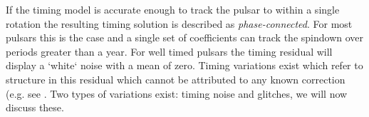If the timing model is accurate enough to track the pulsar to within a single
rotation the resulting timing solution is described as \emph{phase-connected}.
For most pulsars this is the case and a single set of coefficients can track
the spindown over periods greater than a year. For well timed pulsars the 
timing residual will display a `white` noise with a mean of zero. Timing 
variations exist which refer to structure in this residual which cannot be
attributed to any known correction (e.g. see \citet{Edwards2006}. Two types of 
variations exist: timing noise and glitches, we will now discuss these.


